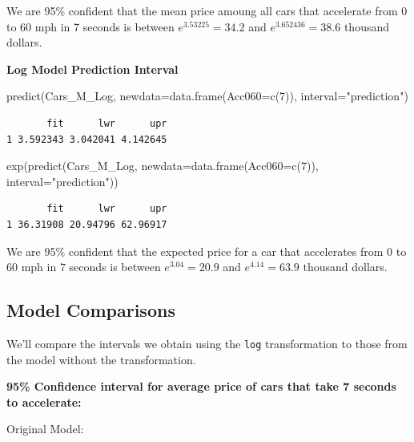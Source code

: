 \documentclass[
  letterpaper,
  DIV=11,
  numbers=noendperiod]{scrreprt}
\newenvironment{Shaded}{\begin{snugshade}}{\end{snugshade}}
\newcommand{\AttributeTok}[1]{\textcolor[rgb]{0.40,0.45,0.13}{#1}}
\newcommand{\DecValTok}[1]{\textcolor[rgb]{0.68,0.00,0.00}{#1}}
\newcommand{\FunctionTok}[1]{\textcolor[rgb]{0.28,0.35,0.67}{#1}}
\newcommand{\NormalTok}[1]{\textcolor[rgb]{0.00,0.23,0.31}{#1}}
\newcommand{\StringTok}[1]{\textcolor[rgb]{0.13,0.47,0.30}{#1}}
\begin{document}
We are 95\% confident that the mean price amoung all cars that
accelerate from 0 to 60 mph in 7 seconds is between
\(e^{3.53225} =34.2\) and \(e^{3.652436}=38.6\) thousand dollars.

\textbf{Log Model Prediction Interval}

\begin{Shaded}
\begin{Highlighting}[]
\FunctionTok{predict}\NormalTok{(Cars\_M\_Log, }\AttributeTok{newdata=}\FunctionTok{data.frame}\NormalTok{(}\AttributeTok{Acc060=}\FunctionTok{c}\NormalTok{(}\DecValTok{7}\NormalTok{)), }\AttributeTok{interval=}\StringTok{"prediction"}\NormalTok{)}
\end{Highlighting}
\end{Shaded}

\begin{verbatim}
       fit      lwr      upr
1 3.592343 3.042041 4.142645
\end{verbatim}

\begin{Shaded}
\begin{Highlighting}[]
\FunctionTok{exp}\NormalTok{(}\FunctionTok{predict}\NormalTok{(Cars\_M\_Log, }\AttributeTok{newdata=}\FunctionTok{data.frame}\NormalTok{(}\AttributeTok{Acc060=}\FunctionTok{c}\NormalTok{(}\DecValTok{7}\NormalTok{)), }\AttributeTok{interval=}\StringTok{"prediction"}\NormalTok{))}
\end{Highlighting}
\end{Shaded}

\begin{verbatim}
       fit      lwr      upr
1 36.31908 20.94796 62.96917
\end{verbatim}

We are 95\% confident that the expected price for a car that accelerates
from 0 to 60 mph in 7 seconds is between \(e^{3.04} =20.9\) and
\(e^{4.14}=63.9\) thousand dollars.

\subsection{Model Comparisons}\label{model-comparisons}

We'll compare the intervals we obtain using the \texttt{log}
transformation to those from the model without the transformation.

\textbf{95\% Confidence interval for average price of cars that take 7
seconds to accelerate:}

Original Model:
\end{document}
